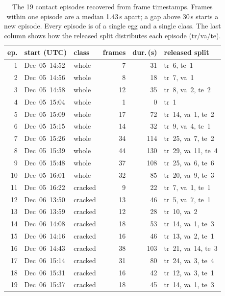 \begin{table}[t]
\centering\small
\caption{The 19 contact episodes recovered from frame timestamps. Frames within one
episode are a median 1.43\,s apart; a gap above 30\,s starts a new episode. Every
episode is of a single egg and a single class. The last column shows how the released
split distributes each episode (tr/va/te).}
\label{tab:episodes}
\begin{tabular}{rllrrl}
\toprule
ep. & start (UTC) & class & frames & dur.\,(s) & released split \\
\midrule
1 & Dec~05\ 14:52 & whole & 7 & 31 & tr~6, te~1 \\
2 & Dec~05\ 14:56 & whole & 8 & 18 & tr~7, va~1 \\
3 & Dec~05\ 14:58 & whole & 12 & 35 & tr~8, va~2, te~2 \\
4 & Dec~05\ 15:04 & whole & 1 & 0 & tr~1 \\
5 & Dec~05\ 15:09 & whole & 17 & 72 & tr~14, va~1, te~2 \\
6 & Dec~05\ 15:15 & whole & 14 & 32 & tr~9, va~4, te~1 \\
7 & Dec~05\ 15:26 & whole & 34 & 114 & tr~25, va~7, te~2 \\
8 & Dec~05\ 15:39 & whole & 44 & 130 & tr~29, va~11, te~4 \\
9 & Dec~05\ 15:48 & whole & 37 & 108 & tr~25, va~6, te~6 \\
10 & Dec~05\ 16:01 & whole & 32 & 85 & tr~20, va~9, te~3 \\
11 & Dec~05\ 16:22 & cracked & 9 & 22 & tr~7, va~1, te~1 \\
12 & Dec~06\ 13:50 & cracked & 13 & 46 & tr~5, va~7, te~1 \\
13 & Dec~06\ 13:59 & cracked & 12 & 28 & tr~10, va~2 \\
14 & Dec~06\ 14:08 & cracked & 18 & 53 & tr~14, va~1, te~3 \\
15 & Dec~06\ 14:16 & cracked & 16 & 46 & tr~13, va~2, te~1 \\
16 & Dec~06\ 14:43 & cracked & 38 & 103 & tr~21, va~14, te~3 \\
17 & Dec~06\ 15:14 & cracked & 31 & 80 & tr~24, va~3, te~4 \\
18 & Dec~06\ 15:31 & cracked & 16 & 42 & tr~12, va~3, te~1 \\
19 & Dec~06\ 15:37 & cracked & 18 & 45 & tr~14, va~1, te~3 \\
\bottomrule
\end{tabular}
\end{table}
